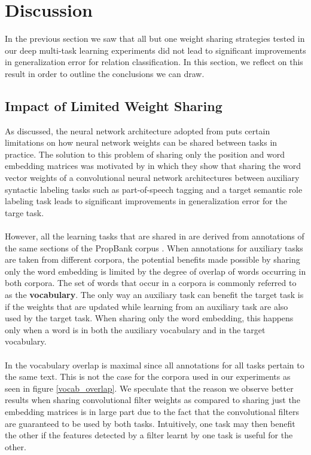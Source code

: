 \chapter{Discussion}
In the previous section we saw that all but one weight sharing strategies tested in our deep multi-task learning experiments did not lead to significant improvements in generalization error for relation classification. In this section, we reflect on this result in order to outline the conclusions we can draw.

\section{Impact of Limited Weight Sharing}
As discussed, the neural network architecture adopted from \citet{nguyen2015} puts certain limitations on how neural network weights can be shared between tasks in practice. The solution to this problem of sharing only the position and word embedding matrices was motivated by \citet{collobert2008} in which they show that sharing the word vector weights of a convolutional neural network architectures between auxiliary syntactic labeling tasks such as part-of-speech tagging and a target semantic role labeling task leads to significant improvements in generalization error for the targe task.
\\\\
However, all the learning tasks that are shared in \citet{collobert2008} are derived from annotations of the same sections of the PropBank corpus \citep{kingsbury2002}. When annotations for auxiliary tasks are taken from different corpora, the potential benefits made possible by sharing only the word embedding is limited by the degree of overlap of words occurring in both corpora. The set of words that occur in a corpora is commonly referred to as the \textbf{vocabulary}. The only way an auxiliary task can benefit the target task is if the weights that are updated while learning from an auxiliary task are also used by the target task. When sharing only the word embedding, this happens only when a word is in both the auxiliary vocabulary and in the target vocabulary.
\\\\
In \citet{collobert2008} the vocabulary overlap is maximal since all annotations for all tasks pertain to the same text. This is not the case for the corpora used in our experiments as seen in figure \ref{vocab_overlap}. We speculate that the reason we observe better results when sharing convolutional filter weights as compared to sharing just the embedding matrices is in large part due to the fact that the convolutional filters are guaranteed to be used by both tasks. Intuitively, one task may then benefit the other if the features detected by a filter learnt by one task is useful for the other.
